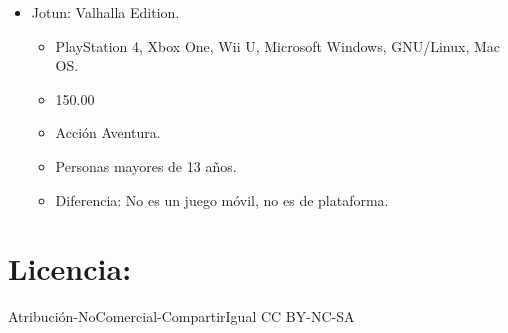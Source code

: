 \begin{itemize}
\item Jotun: Valhalla Edition.
\begin{itemize}
	\item PlayStation 4, Xbox One, Wii U, Microsoft Windows, GNU/Linux, Mac OS.
	\item 150.00
	\item Acción Aventura.
	\item Personas mayores de 13 años.
	\item Diferencia: No es un juego móvil, no es de plataforma.
\end{itemize}

\end{itemize}
	\section{Licencia:}
Atribución-NoComercial-CompartirIgual 
CC BY-NC-SA
